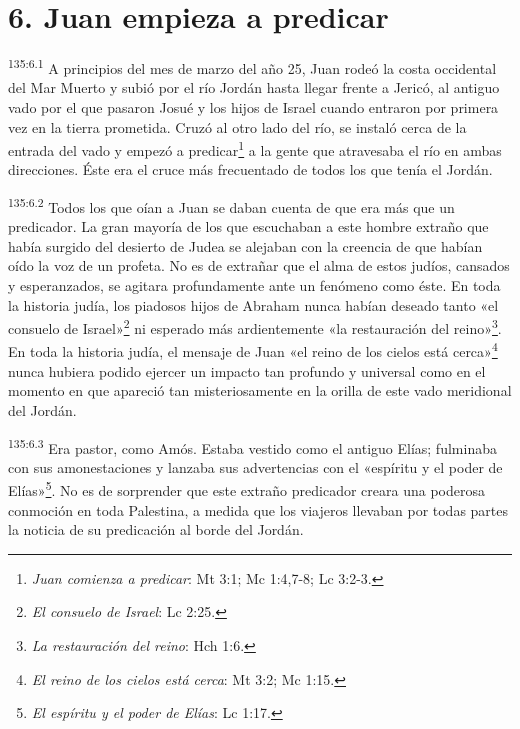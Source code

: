 \section*{6. Juan empieza a predicar}
\par 
\textsuperscript{135:6.1} A principios del mes de marzo del año 25, Juan rodeó la costa occidental del Mar Muerto y subió por el río Jordán hasta llegar frente a Jericó, al antiguo vado por el que pasaron Josué y los hijos de Israel cuando entraron por primera vez en la tierra prometida. Cruzó al otro lado del río, se instaló cerca de la entrada del vado y empezó a predicar\footnote{\textit{Juan comienza a predicar}: Mt 3:1; Mc 1:4,7-8; Lc 3:2-3.} a la gente que atravesaba el río en ambas direcciones. Éste era el cruce más frecuentado de todos los que tenía el Jordán.

\par 
\textsuperscript{135:6.2} Todos los que oían a Juan se daban cuenta de que era más que un predicador. La gran mayoría de los que escuchaban a este hombre extraño que había surgido del desierto de Judea se alejaban con la creencia de que habían oído la voz de un profeta. No es de extrañar que el alma de estos judíos, cansados y esperanzados, se agitara profundamente ante un fenómeno como éste. En toda la historia judía, los piadosos hijos de Abraham nunca habían deseado tanto «el consuelo de Israel»\footnote{\textit{El consuelo de Israel}: Lc 2:25.} ni esperado más ardientemente «la restauración del reino»\footnote{\textit{La restauración del reino}: Hch 1:6.}. En toda la historia judía, el mensaje de Juan «el reino de los cielos está cerca»\footnote{\textit{El reino de los cielos está cerca}: Mt 3:2; Mc 1:15.} nunca hubiera podido ejercer un impacto tan profundo y universal como en el momento en que apareció tan misteriosamente en la orilla de este vado meridional del Jordán.

\par 
\textsuperscript{135:6.3} Era pastor, como Amós. Estaba vestido como el antiguo Elías; fulminaba con sus amonestaciones y lanzaba sus advertencias con el «espíritu y el poder de Elías»\footnote{\textit{El espíritu y el poder de Elías}: Lc 1:17.}. No es de sorprender que este extraño predicador creara una poderosa conmoción en toda Palestina, a medida que los viajeros llevaban por todas partes la noticia de su predicación al borde del Jordán.

